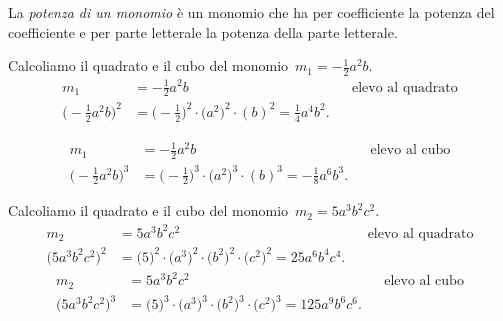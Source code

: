 % 
% 

\begin{definizione}
La \emph{potenza di un monomio} è un monomio
che ha per coefficiente la potenza del coefficiente e per parte
letterale la potenza della parte letterale.
\end{definizione}

\begin{exrig}
 \begin{esempio}
Calcoliamo il quadrato e il cubo del monomio~$m_{1}=-{\frac{1}{2}}a^{2}b$.
\begin{align*}
m_{1}&=-{\frac{1}{2}}a^{2}b && \text{elevo al quadrato}\\
\bigg(-{\frac{1}{2}}a^{2}b\bigg)^{2}
&=\bigg(-{\frac{1}{2}}\bigg)^{2}\cdot\big(a^{2}\big)^{2}\cdot (b)^{2}
=\frac{1}{4}a^{4}b^{2}.
\end{align*}

\begin{align*}
m_{1}&=-{\frac{1}{2}}a^{2}b &&\text{elevo al cubo}\\
\bigg(-{\frac{1}{2}}a^{2}b\bigg)^{3}
&=\bigg(-{\frac{1}{2}}\bigg)^{3}\cdot\big(a^{2}\big)^{3}\cdot (b)^{3}
=-{\frac{1}{8}}a^{6}b^{3}.
\end{align*}
 \end{esempio}

 \begin{esempio}
Calcoliamo il quadrato e il cubo del monomio~$m_{2}=5a^{3}b^{2}c^{2}$.
\begin{align*}
m_{2}&=5a^{3}b^{2}c^{2} &&\text{elevo al quadrato}\\
\big(5a^{3}b^{2}c^{2}\big)^{2}
&=\big(5\big)^{2}\cdot \big(a^{3}\big)^{2}\cdot\big(b^{2}\big)^{2}\cdot 
\big(c^{2}\big)^{2}
=25a^{6}b^{4}c^{4}.
\end{align*}
\begin{align*}
m_{2}&=5a^{3}b^{2}c^{2} &&\text{elevo al cubo}\\
\big(5a^{3}b^{2}c^{2}\big)^{3}
&=\big(5\big)^{3}\cdot \big(a^{3}\big)^{3}\cdot\big(b^{2}\big)^{3}\cdot 
\big(c^{2}\big)^{3}
=125a^{9}b^{6}c^{6}.
\end{align*}
 \end{esempio}
\end{exrig}

